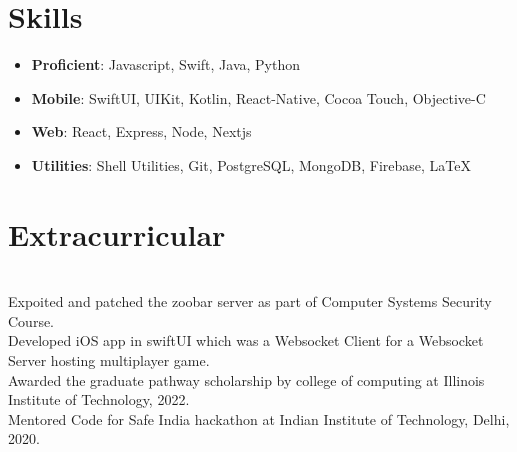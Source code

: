 \documentclass[letterpaper,11pt]{article}
\newcommand{\projectsItem}[2]{
  \item\small{
    \textbf{#1}{: #2 \vspace{-2pt}}
  }
}
\newcommand{\resumeProjectSubItem}[2]{\projectsItem{#1}{#2}\vspace{-4pt}}
\newcommand{\resumeSubHeadingListStart}{\begin{itemize}[leftmargin=0.15in, label={}]}
\newcommand{\resumeSubHeadingListEnd}{\end{itemize}}
\begin{document}
%
\section{Skills}
\resumeSubHeadingListStart
\resumeProjectSubItem{Proficient}
{Javascript, Swift, Java, Python}
\resumeProjectSubItem{Mobile}
{SwiftUI, UIKit, Kotlin, React-Native, Cocoa Touch, Objective-C}
\resumeProjectSubItem{Web}
{React, Express, Node, Nextjs}
\resumeProjectSubItem{Utilities}
{Shell Utilities, Git, PostgreSQL, MongoDB, Firebase, LaTeX}
\resumeSubHeadingListEnd

\section{Extracurricular}
\textbf{} \\\hspace{3mm} Expoited and patched the zoobar server as part of Computer Systems Security Course.
\textbf{} \\\hspace{3mm} Developed iOS app in swiftUI which was a Websocket Client for a Websocket Server hosting multiplayer game.
\textbf{} \\\hspace{3mm} Awarded the graduate pathway scholarship by college of computing at Illinois Institute of Technology, 2022.
\textbf{} \\\hspace{3mm} Mentored Code for Safe India hackathon at Indian Institute of Technology, Delhi, 2020.


\end{document}
